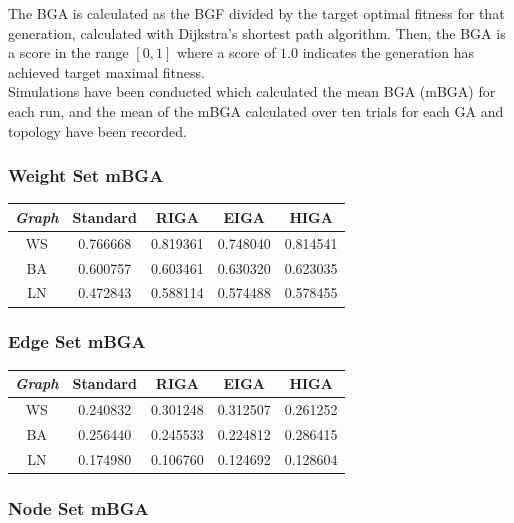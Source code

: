 \documentclass[
	a4paper, %
	10pt, %
	unnumberedsections, %
	twoside, %
]{LTJournalArticle}
\begin{document}
The BGA is calculated as the BGF divided by the target optimal fitness for that generation, calculated with Dijkstra's shortest path algorithm. Then, the BGA is a score in the range \([0, 1]\) where a score of \(1.0\) indicates the generation has achieved target maximal fitness. \\

Simulations have been conducted which calculated the mean BGA (mBGA) for each run, and the mean of the mBGA calculated over ten trials for each GA and topology have been recorded. \\

\subsubsection{Weight Set mBGA} 
\begin{center}
\begin{tabular}{||c c c c c||} 
 \hline
 \emph{Graph} & Standard & RIGA & EIGA & HIGA \\ [0.5ex] 
 \hline\hline
 WS & 0.766668 & 0.819361 & 0.748040 & 0.814541 \\ 
 \hline
 BA & 0.600757 & 0.603461 & 0.630320 & 0.623035 \\
 \hline
 LN & 0.472843 & 0.588114 & 0.574488 & 0.578455 \\
\end{tabular}
\end{center}

\subsubsection{Edge Set mBGA} 
\begin{center}
\begin{tabular}{||c c c c c||} 
 \hline
 \emph{Graph} & Standard & RIGA & EIGA & HIGA \\ [0.5ex] 
 \hline\hline
 WS & 0.240832 & 0.301248 & 0.312507 & 0.261252 \\ 
 \hline
 BA & 0.256440 & 0.245533 & 0.224812 & 0.286415\\
 \hline
 LN & 0.174980 & 0.106760 & 0.124692 & 0.128604  \\
\end{tabular}
\end{center}

\subsubsection{Node Set mBGA}
\end{document}
